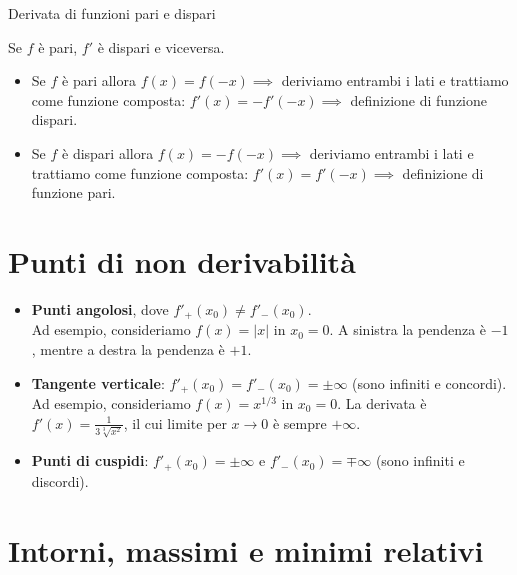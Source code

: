 \documentclass[12pt]{report}
\begin{document}
	\begin{proposizione}{Derivata di funzioni pari e dispari}{}
		
		Se $f$ è pari, $f'$ è dispari e viceversa.
		
	\end{proposizione}
	
	\begin{dimostrazione}{}{}
		
		\begin{itemize}
			
			\item Se $f$ è pari allora $f(x) = f(-x) \implies$ deriviamo entrambi i lati e trattiamo come funzione composta: $f'(x) = -f'(-x) \implies$ definizione di funzione dispari.
			
			\item Se $f$ è dispari allora $f(x) = -f(-x) \implies$ deriviamo entrambi i lati e trattiamo come funzione composta: $f'(x) = f'(-x) \implies$ definizione di funzione pari.
			
		\end{itemize}
		
	\end{dimostrazione}
	
	\section{Punti di non derivabilità}
	
	\begin{itemize}
		
		\item \textbf{Punti angolosi}, dove $f'_+(x_0) \neq f'_-(x_0)$.\\
		Ad esempio, consideriamo $f(x) = |x|$ in $x_0 = 0$. A sinistra la pendenza è $-1$, mentre a destra la pendenza è $+1$.
		
		\item \textbf{Tangente verticale}: $f'_+(x_0) = f'_-(x_0) = \pm \infty$ (sono infiniti e concordi).\\
		Ad esempio, consideriamo $f(x) = x^{1/3}$ in $x_0 = 0$. La derivata è $f'(x) = \frac{1}{3\sqrt[3]{x^2}}$, il cui limite per $x \to 0$ è sempre $+\infty$.
		
		\item \textbf{Punti di cuspidi}: $f'_+(x_0) = \pm \infty$ e $f'_-(x_0) = \mp \infty$ (sono infiniti e discordi).
		
	\end{itemize}
	
	\section{Intorni, massimi e minimi relativi}
	
\end{document}

